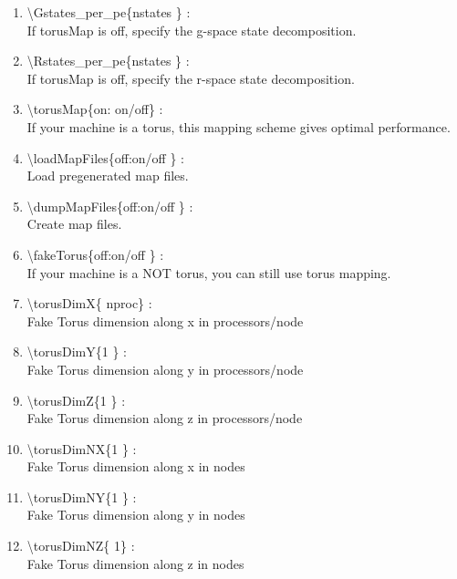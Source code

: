 \documentclass[12pt,titlepage]{article}
\begin{document}
\begin{enumerate}
  \vspace{0.15in} 
  \item \textbackslash{}Gstates\_per\_pe\{nstates \} : \\    
  If torusMap is off, specify the g-space state decomposition.
  \vspace{0.15in} 
  \item \textbackslash{}Rstates\_per\_pe\{nstates \} : \\    
  If torusMap is off, specify the r-space state decomposition.
  \vspace{0.15in} 
  \item \textbackslash{}torusMap\{on: on/off\} : \\    
  If your machine is a torus, this mapping scheme gives optimal performance.
  \vspace{0.15in} 
  \item \textbackslash{}loadMapFiles\{off:on/off \} : \\    
  Load pregenerated map files.
  \vspace{0.15in} 
  \item \textbackslash{}dumpMapFiles\{off:on/off \} : \\    
  Create map files.
  \vspace{0.15in} 
  \item \textbackslash{}fakeTorus\{off:on/off \} : \\    
  If your machine is a NOT torus, you can still use torus mapping.
  \vspace{0.15in} 
  \item \textbackslash{}torusDimX\{ nproc\} : \\    
  Fake Torus dimension along x in processors/node
  \vspace{0.15in} 
  \item \textbackslash{}torusDimY\{1 \} : \\    
  Fake Torus dimension along y in processors/node
  \vspace{0.15in} 
  \item \textbackslash{}torusDimZ\{1 \} : \\    
  Fake Torus dimension along z in processors/node
  \vspace{0.15in} 
  \item \textbackslash{}torusDimNX\{1 \} : \\    
  Fake Torus dimension along x in nodes
  \vspace{0.15in} 
  \item \textbackslash{}torusDimNY\{1 \} : \\    
  Fake Torus dimension along y in nodes
  \vspace{0.15in} 
  \item \textbackslash{}torusDimNZ\{ 1\} : \\    
  Fake Torus dimension along z in nodes
\end{enumerate}



\end{document}
